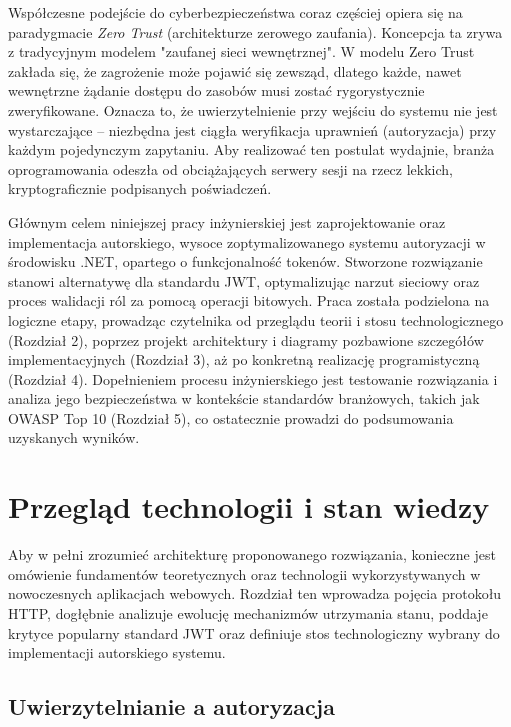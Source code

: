 \documentclass{SGGW-thesis}
\begin{document}
Współczesne podejście do cyberbezpieczeństwa coraz częściej opiera się na paradygmacie \textit{Zero Trust} (architekturze zerowego zaufania). Koncepcja ta zrywa z tradycyjnym modelem "zaufanej sieci wewnętrznej". W modelu Zero Trust zakłada się, że zagrożenie może pojawić się zewsząd, dlatego każde, nawet wewnętrzne żądanie dostępu do zasobów musi zostać rygorystycznie zweryfikowane. Oznacza to, że uwierzytelnienie przy wejściu do systemu nie jest wystarczające – niezbędna jest ciągła weryfikacja uprawnień (autoryzacja) przy każdym pojedynczym zapytaniu. Aby realizować ten postulat wydajnie, branża oprogramowania odeszła od obciążających serwery sesji na rzecz lekkich, kryptograficznie podpisanych poświadczeń.

Głównym celem niniejszej pracy inżynierskiej jest zaprojektowanie oraz implementacja autorskiego, wysoce zoptymalizowanego systemu autoryzacji w środowisku .NET, opartego o funkcjonalność tokenów. Stworzone rozwiązanie stanowi alternatywę dla standardu JWT, optymalizując narzut sieciowy oraz proces walidacji ról za pomocą operacji bitowych. Praca została podzielona na logiczne etapy, prowadząc czytelnika od przeglądu teorii i stosu technologicznego (Rozdział 2), poprzez projekt architektury i diagramy pozbawione szczegółów implementacyjnych (Rozdział 3), aż po konkretną realizację programistyczną (Rozdział 4). Dopełnieniem procesu inżynierskiego jest testowanie rozwiązania i analiza jego bezpieczeństwa w kontekście standardów branżowych, takich jak OWASP Top 10 (Rozdział 5), co ostatecznie prowadzi do podsumowania uzyskanych wyników.

\clearpage

\section{Przegląd technologii i stan wiedzy}

Aby w pełni zrozumieć architekturę proponowanego rozwiązania, konieczne jest omówienie fundamentów teoretycznych oraz technologii wykorzystywanych w nowoczesnych aplikacjach webowych. Rozdział ten wprowadza pojęcia protokołu HTTP, dogłębnie analizuje ewolucję mechanizmów utrzymania stanu, poddaje krytyce popularny standard JWT oraz definiuje stos technologiczny wybrany do implementacji autorskiego systemu.

\subsection{Uwierzytelnianie a autoryzacja}
\end{document}
